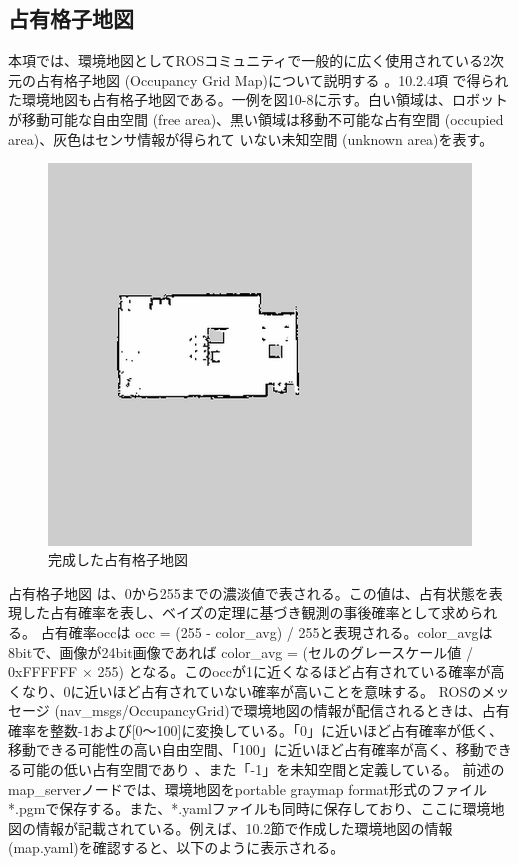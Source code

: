 \subsection{占有格子地図}

本項では、環境地図としてROSコミュニティで一般的に広く使用されている2次元の占有格子地図 (Occupancy Grid Map)について説明する  。10.2.4項  で得られた環境地図も占有格子地図である。一例を図10-8に示す。白い領域は、ロボットが移動可能な自由空間 (free area)、黒い領域は移動不可能な占有空間 (occupied area)、灰色はセンサ情報が得られて  いない未知空間 (unknown area)を表す。

\begin{figure}[htp]
  \centering
  \includegraphics[width=\columnwidth]{pictures/chapter10/pic_10_08.png}
  \caption{完成した占有格子地図}
\end{figure}

占有格子地図  は、0から255までの濃淡値で表される。この値は、占有状態を表現した占有確率を表し、ベイズの定理に基づき観測の事後確率として求められる。  占有確率occは occ = (255 - color\_avg) / 255と表現される。color\_avgは8bitで、画像が24bit画像であれば color\_avg = (セルのグレースケール値 / 0xFFFFFF × 255) となる。このoccが1に近くなるほど占有されている確率が高くなり、0に近いほど占有されていない確率が高いことを意味する。
ROSのメッセージ (nav\_msgs/OccupancyGrid)で環境地図の情報が配信されるときは、占有確率を整数-1および[0〜100]に変換している。「0」に近いほど占有確率が低く、移動できる可能性の高い自由空間、「100」に近いほど占有確率が高く、移動できる可能の低い占有空間であり  、また「-1」を未知空間と定義している。
前述のmap\_serverノードでは、環境地図をportable graymap format形式のファイル*.pgmで保存する。また、*.yamlファイルも同時に保存しており、ここに環境地図の情報が記載されている。例えば、10.2節で作成した環境地図の情報(map.yaml)を確認すると、以下のように表示される。

